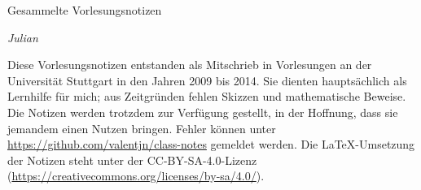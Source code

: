 
\ihead{\leftmark}
\ifoot{\vspace{-1.5mm}\rightmark}

\thispagestyle{empty}
\vspace*{1em}

{%
  \huge%
  Gesammelte Vorlesungsnotizen%
}
\vspace*{1em}

\emph{Julian }

\vspace*{1em}

Diese Vorlesungsnotizen entstanden als Mitschrieb in Vorlesungen
an der Universität Stuttgart in den Jahren 2009 bis 2014.
Sie dienten hauptsächlich als Lernhilfe für mich;
aus Zeitgründen fehlen Skizzen und mathematische Beweise.
Die Notizen werden trotzdem zur Verfügung gestellt, in der Hoffnung,
dass sie jemandem einen Nutzen bringen.
Fehler können unter \url{https://github.com/valentjn/class-notes} gemeldet werden.
Die \LaTeX{}-Umsetzung der Notizen steht unter der CC-BY-SA-4.0-Lizenz
(\url{https://creativecommons.org/licenses/by-sa/4.0/}).

{%
  \setcounter{tocdepth}{\parttocdepth}


  \renewcommand*{\contentsname}{Vorlesungen}
  \tableofcontents%
}

\pagebreak

{%

  \setcounter{tocdepth}{\subsubsectiontocdepth}

  \tableofcontents%
}

\pagebreak



